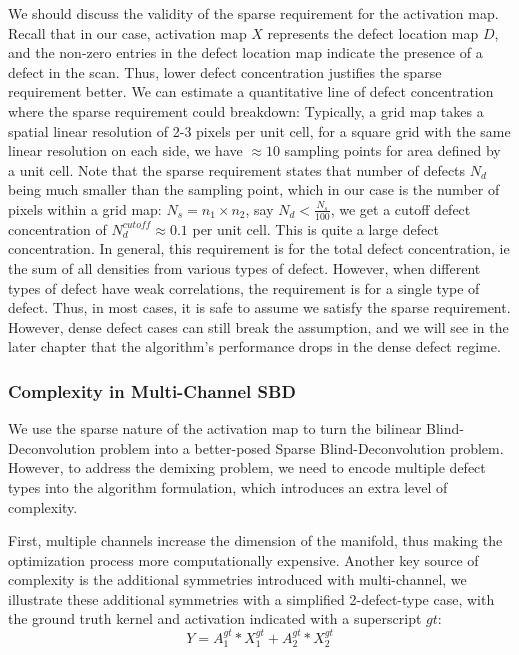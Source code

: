 We should discuss the validity of the sparse requirement for the activation map. Recall that in our case, activation map $X$ represents the defect location map $D$, and the non-zero entries in the defect location map indicate the presence of a defect in the scan. Thus, lower defect concentration justifies the sparse requirement better. We can estimate a quantitative line of defect concentration where the sparse requirement could breakdown: Typically, a grid map takes a spatial linear resolution of 2-3 pixels per unit cell, for a square grid with the same linear resolution on each side, we have $\approx 10$ sampling points for area defined by a unit cell. Note that the sparse requirement states that number of defects $N_d$ being much smaller than the sampling point, which in our case is the number of pixels within a grid map: $N_s = n_1 \times n_2$, say $N_d < \frac{N_s}{100}$, we get a cutoff defect concentration of $N_d^{cutoff} \approx 0.1$ per unit cell. This is quite a large defect concentration. In general, this requirement is for the total defect concentration, ie the sum of all densities from various types of defect. However, when different types of defect have weak correlations, the requirement is for a single type of defect. Thus, in most cases, it is safe to assume we satisfy the sparse requirement. However, dense defect cases can still break the assumption, and we will see in the later chapter that the algorithm's performance drops in the dense defect regime. 

\subsubsection{Complexity in Multi-Channel SBD}
We use the sparse nature of the activation map to turn the bilinear Blind-Deconvolution problem into a better-posed Sparse Blind-Deconvolution problem. However, to address the demixing problem, we need to encode multiple defect types into the algorithm formulation, which introduces an extra level of complexity. 

First, multiple channels increase the dimension of the manifold, thus making the optimization process more computationally expensive. Another key source of complexity is the additional symmetries introduced with multi-channel, we illustrate these additional symmetries with a simplified 2-defect-type case, with the ground truth kernel and activation indicated with a superscript $gt$: 
\begin{equation*}
	Y = A_1^{gt}*X_1^{gt} + A_2^{gt}*X_2^{gt}
\end{equation*} 

